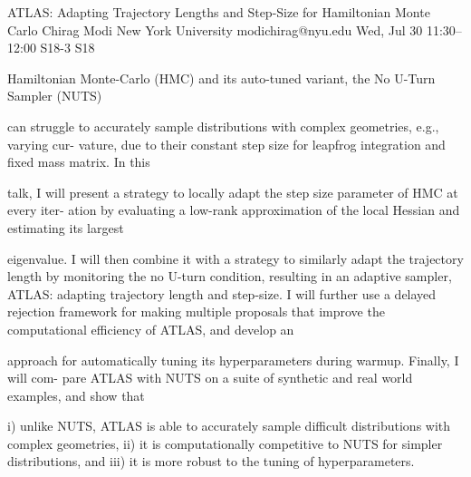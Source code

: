 \documentclass[12pt,lettersize,oneside]{book} %
\begin{document}
\begin{talk}
  {ATLAS: Adapting Trajectory Lengths and Step-Size for Hamiltonian Monte Carlo}%
  {Chirag Modi}%
  {New York University}%
  {modichirag@nyu.edu}%
  {}%
  {}%
  {Wed, Jul 30 11:30--12:00}%
  {S18-3}%
  {S18}%
  {}%
  
    

Hamiltonian Monte-Carlo (HMC) and its auto-tuned variant, the No U-Turn Sampler (NUTS)

can struggle to accurately sample distributions with complex geometries, e.g., varying cur-
vature, due to their constant step size for leapfrog integration and fixed mass matrix. In this

talk, I will present a strategy to locally adapt the step size parameter of HMC at every iter-
ation by evaluating a low-rank approximation of the local Hessian and estimating its largest

eigenvalue. I will then combine it with a strategy to similarly adapt the trajectory length
by monitoring the no U-turn condition, resulting in an adaptive sampler, ATLAS: adapting
trajectory length and step-size. I will further use a delayed rejection framework for making
multiple proposals that improve the computational efficiency of ATLAS, and develop an

approach for automatically tuning its hyperparameters during warmup. Finally, I will com-
pare ATLAS with NUTS on a suite of synthetic and real world examples, and show that

i) unlike NUTS, ATLAS is able to accurately sample difficult distributions with complex
geometries, ii) it is computationally competitive to NUTS for simpler distributions, and iii)
it is more robust to the tuning of hyperparameters.
\medskip

\end{talk}
\end{document}
